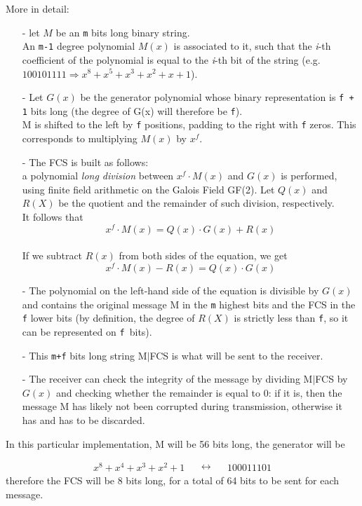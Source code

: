 \noindent More in detail:
\begin{itemize}[leftmargin=0pt, topsep=0pt,itemsep=-1ex,partopsep=1ex,parsep=1ex]
	\item[-] let $M$ be an \texttt{m} bits long binary string.\\
	An \texttt{m-1} degree polynomial $M(x)$ is associated to it, such that the \textit{i}-th coefficient of the polynomial is equal to the \textit{i}-th bit of the string (e.g. $100101111 \Rightarrow x^{8} + x^{5} + x^{3} + x^{2} + x + 1$).\\
	\item[-] Let $G(x)$ be the generator polynomial whose binary representation is \texttt{f + 1} bits long (the degree of G(x) will therefore be \texttt{f}).\\
M is shifted to the left by \texttt{f} positions, padding to the right with \texttt{f} zeros. This corresponds to multiplying $M(x)$ by $x^f$.\\
	\item[-] The FCS is built as follows:\\
	a polynomial \textit{long division} between $x^{f}{\cdot}M(x)$ and $G(x)$ is performed, using finite field arithmetic on the Galois Field GF(2). Let $Q(x)$ and $R(X)$ be the quotient and the remainder of such division, respectively. \\
	It follows that 
	\begin{equation}
		x^{f}{\cdot}M(x) = Q(x)\cdot G(x) + R(x)
		\label{eq:polynomial1}
	\end{equation}
\\
	If we subtract $R(x)$ from both sides of the equation, we get
	\begin{equation}
			x^{f}{\cdot}M(x) - R(x) = Q(x)\cdot G(x)
			\label{eq:polynomial2}
	\end{equation}
	\item[-] The polynomial on the left-hand side of the equation is divisible by $G(x)$ and contains the original message M in the \texttt{m} highest bits and the FCS in the \texttt{f} lower bits (by definition, the degree of $R(X)$ is strictly less than \texttt{f}, so it can be represented on \texttt{f }bits).\\
	\item[-] This \texttt{m+f} bits long string M{$|$}FCS is what will be sent to the receiver.\\
	\item[-] The receiver can check the integrity of the message by dividing M{$|$}FCS by $G(x)$ and checking whether the remainder is equal to 0: if it is, then the message M has likely not been corrupted during transmission, otherwise it has and has to be discarded.
\end{itemize}
\hfill \break
In this particular implementation, M will be 56 bits long, the generator will be

	\begin{equation}
		\begin{split}
			x^{8} + x^{4} + x^{3} + x^{2} + 1
	  	\end{split}
	\quad\leftrightarrow\quad
  		\begin{split}
			100011101
  		\end{split}
	\label{eq:generator}
	\end{equation}
therefore the FCS will be 8 bits long, for a total of 64 bits to be sent for each message.
